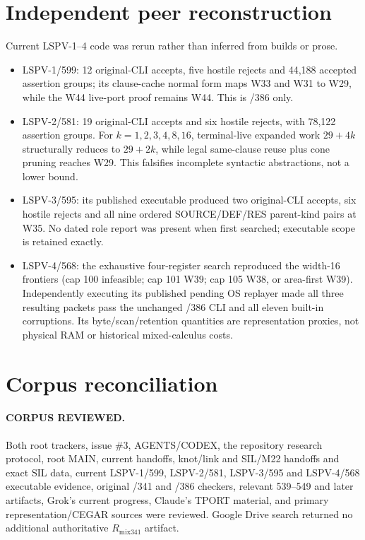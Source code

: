 \documentclass[11pt]{article}
\begin{document}
\section{Independent peer reconstruction}
Current LSPV-1--4 code was rerun rather than inferred from builds or prose.
\begin{itemize}
\item LSPV-1/599: 12 original-CLI accepts, five hostile rejects and 44,188
  accepted assertion groups; its clause-cache normal form maps W33 and W31 to
  W29, while the W44 live-port proof remains W44.  This is /386 only.
\item LSPV-2/581: 19 original-CLI accepts and six hostile rejects, with 78,122
  assertion groups.  For $k=1,2,3,4,8,16$, terminal-live expanded work
  $29+4k$ structurally reduces to $29+2k$, while legal same-clause reuse plus
  cone pruning reaches W29.  This falsifies incomplete syntactic abstractions,
  not a lower bound.
\item LSPV-3/595: its published executable produced two original-CLI accepts,
  six hostile rejects and all nine ordered SOURCE/DEF/RES parent-kind pairs at
  W35.  No dated role report was present when first searched; executable scope
  is retained exactly.
\item LSPV-4/568: the exhaustive four-register search reproduced the width-16
  frontiers (cap 100 infeasible; cap 101 W39; cap 105 W38, or area-first W39).
  Independently executing its published pending OS replayer made all three
  resulting packets pass the unchanged /386 CLI and all eleven built-in
  corruptions.  Its byte/scan/retention quantities are representation proxies,
  not physical RAM or historical mixed-calculus costs.
\end{itemize}

\section{Corpus reconciliation}
\paragraph{CORPUS REVIEWED.}
Both root trackers, issue \#3, AGENTS/CODEX, the repository research protocol,
root MAIN, current handoffs, knot/link and SIL/M22 handoffs and exact SIL data,
current LSPV-1/599, LSPV-2/581, LSPV-3/595 and LSPV-4/568 executable evidence,
original /341 and /386 checkers, relevant 539--549 and later artifacts, Grok's
current progress, Claude's TPORT material, and primary representation/CEGAR
sources were reviewed.  Google Drive search returned no additional
authoritative $R_{\mathrm{mix341}}$ artifact.
\end{document}
